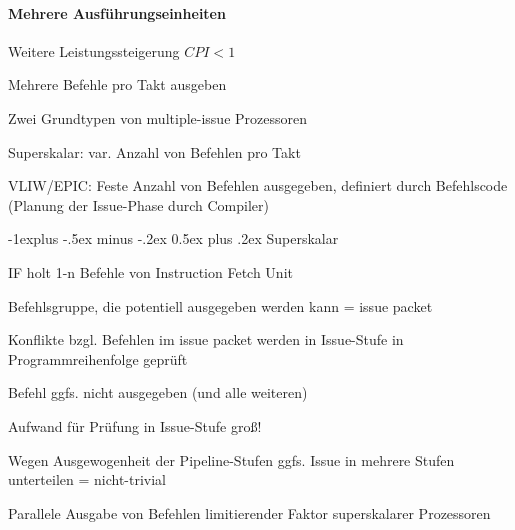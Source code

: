 \documentclass[a4paper]{article}
\makeatletter
\renewcommand{\subsection}{\@startsection{subsection}{2}{0mm}%
                                {-1explus -.5ex minus -.2ex}%
                                {0.5ex plus .2ex}%
                                {\normalfont\normalsize\bfseries}}
\makeatother
\begin{document}
\begin{multicols}{3}
  \paragraph{Mehrere Ausführungseinheiten}
  \begin{itemize*}
    \item Weitere Leistungssteigerung $CPI < 1$
    \item Mehrere Befehle pro Takt ausgeben
    \item Zwei Grundtypen von multiple-issue Prozessoren
    \begin{itemize*}
      \item Superskalar: var. Anzahl von Befehlen pro Takt
      \item VLIW/EPIC: Feste Anzahl von Befehlen ausgegeben, definiert durch Befehlscode (Planung der Issue-Phase durch Compiler)
    \end{itemize*}
  \end{itemize*}
  
  \subsection{Superskalar}
  \begin{itemize*}
    \item IF holt 1-n Befehle von Instruction Fetch Unit
    \item Befehlsgruppe, die potentiell ausgegeben werden kann = issue packet
    \item Konflikte bzgl. Befehlen im issue packet werden in Issue-Stufe in Programmreihenfolge geprüft
    \item Befehl ggfs. nicht ausgegeben (und alle weiteren)
    \item Aufwand für Prüfung in Issue-Stufe groß!
    \item Wegen Ausgewogenheit der Pipeline-Stufen ggfs. Issue in mehrere Stufen unterteilen = nicht-trivial
    \item Parallele Ausgabe von Befehlen limitierender Faktor superskalarer Prozessoren
  \end{itemize*}
  

\end{multicols}
\end{document}
